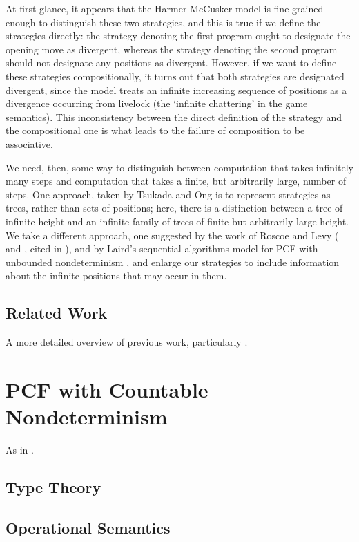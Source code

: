 \documentclass{entcs} \usepackage{prentcsmacro}
\newcommand{\0}{{\mathtt{0}}}
\begin{document}
At first glance, it appears that the Harmer-McCusker model is fine-grained enough to distinguish these two strategies, and this is true if we define the strategies directly: the strategy denoting the first program ought to designate the opening move as divergent, whereas the strategy denoting the second program should not designate any positions as divergent.  However, if we want to define these strategies compositionally, it turns out that both strategies are designated divergent, since the model treats an infinite increasing sequence of positions as a divergence occurring from livelock (the `infinite chattering' in the game semantics).  This inconsistency between the direct definition of the strategy and the compositional one is what leads to the failure of composition to be associative.  

We need, then, some way to distinguish between computation that takes infinitely many steps and computation that takes a finite, but arbitrarily large, number of steps.  One approach, taken by Tsukada and Ong \cite{TsukadaSheaves} is to represent strategies as trees, rather than sets of positions; here, there is a distinction between a tree of infinite height and an infinite family of trees of finite but arbitrarily large height.  We take a different approach, one suggested by the work of Roscoe and Levy (\cite{RoscoeCspInfinite} and \cite{LevyGsInfinite}, cited in \cite{TsukadaSheaves}), and by Laird's sequential algorithms model for PCF with unbounded nondeterminism \cite{LairdOrdinalGames}, and enlarge our strategies to include information about the infinite positions that may occur in them.  

\subsection{Related Work}

A more detailed overview of previous work, particularly \cite{LairdOrdinalGames}.

\section{PCF with Countable Nondeterminism}

As in \cite{LairdOrdinalGames}.  

\subsection{Type Theory}

\subsection{Operational Semantics}
\end{document}
